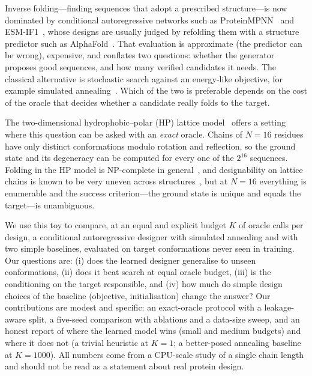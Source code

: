 Inverse folding---finding sequences that adopt a prescribed structure---is now dominated by conditional autoregressive networks such as ProteinMPNN~\cite{dauparas2022robust} and ESM-IF1~\cite{hsu2022learning}, whose designs are usually judged by refolding them with a structure predictor such as AlphaFold~\cite{jumper2021highly}. That evaluation is approximate (the predictor can be wrong), expensive, and conflates two questions: whether the generator proposes good sequences, and how many verified candidates it needs. The classical alternative is stochastic search against an energy-like objective, for example simulated annealing~\cite{kirkpatrick1983optimization}. Which of the two is preferable depends on the cost of the oracle that decides whether a candidate really folds to the target.

The two-dimensional hydrophobic--polar (HP) lattice model~\cite{lau1989lattice} offers a setting where this question can be asked with an \emph{exact} oracle. Chains of $N=16$ residues have only  distinct conformations modulo rotation and reflection, so the ground state and its degeneracy can be computed for every one of the $2^{16}$ sequences. Folding in the HP model is NP-complete in general~\cite{berger1998protein}, and designability on lattice chains is known to be very uneven across structures~\cite{li1996emergence}, but at $N=16$ everything is enumerable and the success criterion---the ground state is unique and equals the target---is unambiguous.

We use this toy to compare, at an equal and explicit budget $K$ of oracle calls per design, a conditional autoregressive designer with simulated annealing and with two simple baselines, evaluated on target conformations never seen in training. Our questions are: (i) does the learned designer generalise to unseen conformations, (ii) does it beat search at equal oracle budget, (iii) is the conditioning on the target responsible, and (iv) how much do simple design choices of the baseline (objective, initialisation) change the answer? Our contributions are modest and specific: an exact-oracle protocol with a leakage-aware split, a five-seed comparison with ablations and a data-size sweep, and an honest report of where the learned model wins (small and medium budgets) and where it does not (a trivial heuristic at $K=1$; a better-posed annealing baseline at $K=1000$). All numbers come from a CPU-scale study of a single chain length and should not be read as a statement about real protein design.
